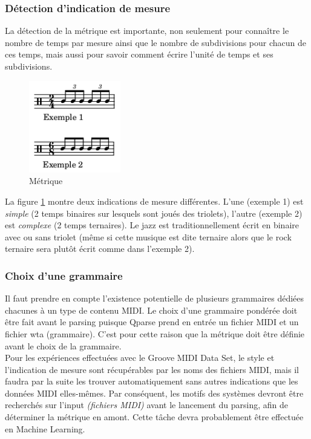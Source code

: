 \subsubsection{Détection d’indication de mesure}
La détection de la métrique est importante, non seulement pour connaître le nombre de temps par mesure ainsi que le nombre de subdivisions pour chacun de ces temps, mais aussi pour savoir comment écrire l’unité de temps et ses subdivisions.
\begin{figure}[h]
	\centering
	\includegraphics[height=40mm, width=40mm]{z_images/3_methodes/2_systemes/0_simple_VS_complexe.png}
	\caption{Métrique}
	\label{subdivisions}
\end{figure}\newpage
La figure \ref{subdivisions} montre deux indications de mesure différentes. L’une (exemple 1) est \textit{simple} (2 temps binaires sur lesquels sont joués des triolets), l’autre (exemple 2) est \textit{complexe} (2 temps ternaires). Le jazz est traditionnellement écrit en binaire avec ou sans triolet (même si cette musique est dite ternaire alors que le rock ternaire sera plutôt écrit comme dans l’exemple 2).
\subsubsection{Choix d’une grammaire}
Il faut prendre en compte l’existence potentielle de plusieurs grammaires dédiées chacunes à un type de contenu MIDI. Le choix d’une grammaire pondérée doit être fait avant le parsing puisque Qparse prend en entrée un fichier MIDI et un fichier wta (grammaire). C’est pour cette raison que la métrique doit être définie avant le choix de la grammaire.\\
Pour les expériences effectuées avec le Groove MIDI Data Set, le style et l’indication de mesure sont récupérables par les noms des fichiers MIDI, mais il faudra par la suite les trouver automatiquement sans autres indications que les données MIDI elles-mêmes. Par conséquent, les motifs des systèmes devront être recherchés sur l’input \textit{(fichiers MIDI)} avant le lancement du parsing, afin de déterminer la métrique en amont. Cette tâche devra probablement être effectuée en Machine Learning.\newpage
